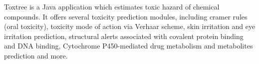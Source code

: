 Toxtree is a Java application which estimates toxic hazard of chemical compounds. It offers several toxicity prediction modules, including cramer rules (oral toxicity), toxicity mode of action via Verhaar scheme, skin irritation and eye irritation prediction, structural alerts associated with covalent protein binding and DNA binding, Cytochrome P450-mediated drug metabolism and metabolites prediction and more.